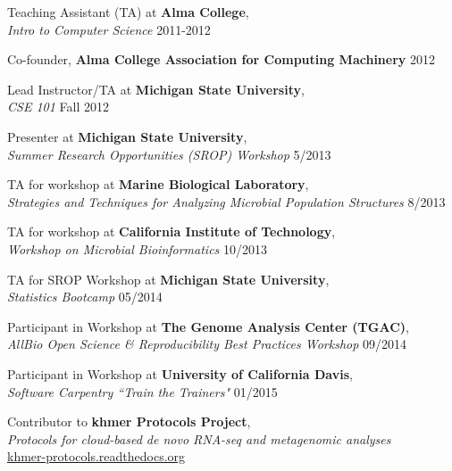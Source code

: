 \documentclass[margin,12pt]{camille_resume}
\begin{document}
\begin{resume}
\begin{list1}
\item[] Teaching Assistant (TA) at {\bf Alma College},\\
{\em Intro to Computer Science} \hfill 2011-2012\\

\item[] Co-founder, {\bf Alma College Association for Computing Machinery} \hfill 2012\\

\item[] Lead Instructor/TA at {\bf Michigan State University},\\
{\em CSE 101} \hfill Fall 2012\\

\item[] Presenter at {\bf Michigan State University},\\
{\em Summer Research Opportunities (SROP) Workshop} \hfill 5/2013\\

\item[] TA for workshop at {\bf Marine Biological Laboratory}, \\
{\em Strategies and Techniques for Analyzing Microbial Population Structures} \hfill 8/2013\\

\item[] TA for workshop at {\bf California Institute of Technology}, \\
{\em Workshop on Microbial Bioinformatics}  \hfill 10/2013\\

\item[] TA for SROP Workshop at {\bf Michigan State University}, \\
{\em Statistics Bootcamp} \hfill 05/2014\\

\item[] Participant in Workshop at {\bf The Genome Analysis Center (TGAC)},\\
{\em AllBio Open Science \& Reproducibility Best Practices Workshop} \hfill 09/2014\\

\item[] Participant in Workshop at {\bf University of California Davis},\\
{\em Software Carpentry ``Train the Trainers" } \hfill 01/2015\\

\item[] Contributor to {\bf khmer Protocols Project},\\
{\em Protocols for cloud-based de novo RNA-seq and metagenomic analyses}\\
\hfill \href{https://khmer-protocols.readthedocs.org/}{khmer-protocols.readthedocs.org}\\


\end{list1}
\end{resume}
\end{document}
